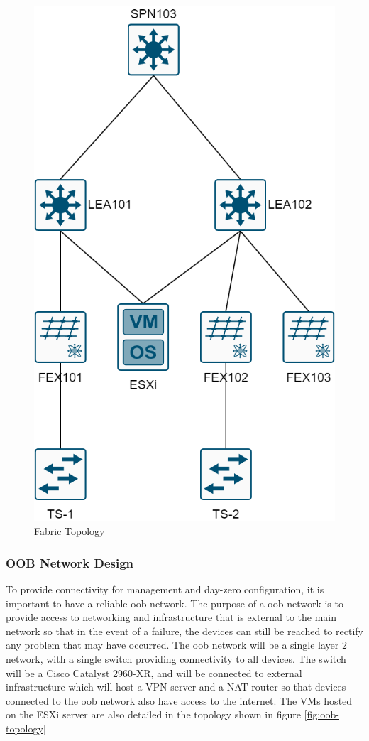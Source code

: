 \begin{figure}[H]
    \centering
    \includegraphics[scale=0.3]{images/aci-topology.png}
    \caption{Fabric Topology}
    \label{fig:fabric-topology}
\end{figure}

\subsubsection{OOB Network Design}
\label{design:Testbed:network-design:oob}
To provide connectivity for management and day-zero configuration, it is important to have a reliable \gls{oob} network. The purpose of a \gls{oob} network is to provide access to networking and infrastructure that is external to the main network so that in the event of a failure, the devices can still be reached to rectify any problem that may have occurred. The \gls{oob} network will be a single layer 2 network, with a single switch providing connectivity to all devices. The switch will be a Cisco Catalyst 2960-XR, and will be connected to external infrastructure which will host a VPN server and a NAT router so that devices connected to the \gls{oob} network also have access to the internet. The VMs hosted on the ESXi server are also detailed in the topology shown in figure \ref{fig:oob-topology}

